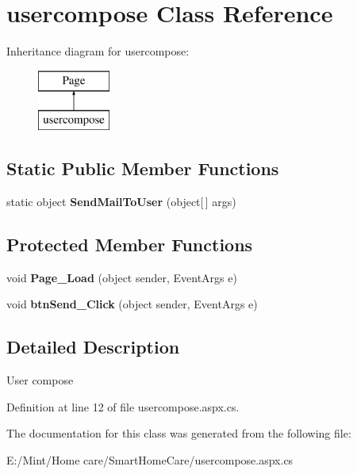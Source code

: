 \hypertarget{classusercompose}{\section{usercompose Class Reference}
\label{classusercompose}
}
Inheritance diagram for usercompose\-:\begin{figure}[H]
\begin{center}
\leavevmode
\includegraphics[height=2.000000cm]{classusercompose}
\end{center}
\end{figure}
\subsection*{Static Public Member Functions}
\begin{DoxyCompactItemize}
\item 
\hypertarget{classusercompose_a5d746e6f05e3eeac2c1e01448ade9017}{static object {\bfseries Send\-Mail\-To\-User} (object\mbox{[}$\,$\mbox{]} args)}\label{classusercompose_a5d746e6f05e3eeac2c1e01448ade9017}

\end{DoxyCompactItemize}
\subsection*{Protected Member Functions}
\begin{DoxyCompactItemize}
\item 
\hypertarget{classusercompose_afb83828a828e0ef09530ef29f78afd68}{void {\bfseries Page\-\_\-\-Load} (object sender, Event\-Args e)}\label{classusercompose_afb83828a828e0ef09530ef29f78afd68}

\item 
\hypertarget{classusercompose_a2cfbb63e67c9ec7d69fe6ff26fb5df96}{void {\bfseries btn\-Send\-\_\-\-Click} (object sender, Event\-Args e)}\label{classusercompose_a2cfbb63e67c9ec7d69fe6ff26fb5df96}

\end{DoxyCompactItemize}


\subsection{Detailed Description}
User compose 

Definition at line 12 of file usercompose.\-aspx.\-cs.



The documentation for this class was generated from the following file\-:\begin{DoxyCompactItemize}
\item 
E\-:/\-Mint/\-Home care/\-Smart\-Home\-Care/usercompose.\-aspx.\-cs\end{DoxyCompactItemize}
